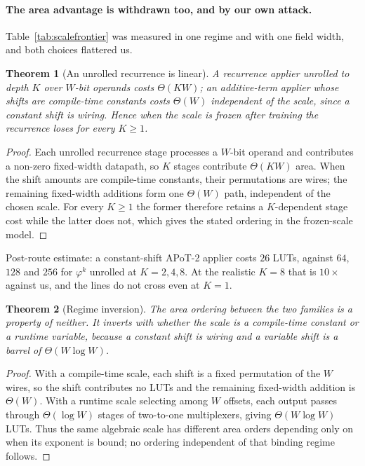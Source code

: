 \documentclass[11pt]{article}
\newtheorem{theorem}{Theorem}
\theoremstyle{definition}
\begin{document}
\paragraph{The area advantage is withdrawn too, and by our own attack.}
Table~\ref{tab:scalefrontier} was measured in one regime and with one field
width, and both choices flattered us.

\begin{theorem}[An unrolled recurrence is linear]
\label{thm:unrolled}
A recurrence applier unrolled to depth $K$ over $W$-bit operands costs
$\Theta(KW)$; an additive-term applier whose shifts are compile-time constants
costs $\Theta(W)$ independent of the scale, since a constant shift is wiring.
Hence when the scale is frozen after training the recurrence loses for every
$K \ge 1$.
\end{theorem}
\begin{proof}
Each unrolled recurrence stage processes a $W$-bit operand and contributes a
non-zero fixed-width datapath, so $K$ stages contribute $\Theta(KW)$ area.
When the shift amounts are compile-time constants, their permutations are wires;
the remaining fixed-width additions form one $\Theta(W)$ path, independent of
the chosen scale.  For every $K\geq1$ the former therefore retains a
$K$-dependent stage cost while the latter does not, which gives the stated
ordering in the frozen-scale model.
\end{proof}

Post-route estimate: a constant-shift APoT-2 applier costs $26$ LUTs, against $64$, $128$
and $256$ for $\varphi^{k}$ unrolled at $K=2,4,8$. At the realistic $K=8$ that is
$10\times$ against us, and the lines do not cross even at $K=1$.

\begin{theorem}[Regime inversion]
\label{thm:regime}
The area ordering between the two families is a property of neither. It inverts
with whether the scale is a compile-time constant or a runtime variable, because
a constant shift is wiring and a variable shift is a barrel of
$\Theta(W\log W)$.
\end{theorem}
\begin{proof}
With a compile-time scale, each shift is a fixed permutation of the $W$ wires,
so the shift contributes no LUTs and the remaining fixed-width addition is
$\Theta(W)$.  With a runtime scale selecting among $W$ offsets, each output
passes through $\Theta(\log W)$ stages of two-to-one multiplexers, giving
$\Theta(W\log W)$ LUTs.  Thus the same algebraic scale has different area
orders depending only on when its exponent is bound; no ordering independent
of that binding regime follows.
\end{proof}
\end{document}
